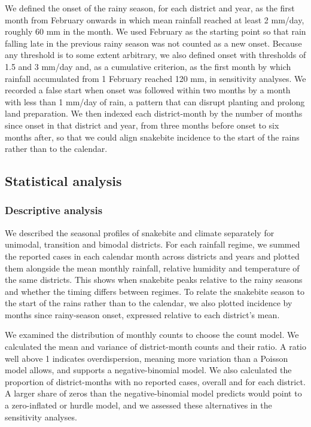 \documentclass[11pt,a4paper]{article}
\begin{document}
We defined the onset of the rainy season, for each district and year, as the first month from February onwards in which mean rainfall reached at least 2 mm/day, roughly 60 mm in the month. We used February as the starting point so that rain falling late in the previous rainy season was not counted as a new onset. Because any threshold is to some extent arbitrary, we also defined onset with thresholds of 1.5 and 3 mm/day and, as a cumulative criterion, as the first month by which rainfall accumulated from 1 February reached 120 mm, in sensitivity analyses. We recorded a false start when onset was followed within two months by a month with less than 1 mm/day of rain, a pattern that can disrupt planting and prolong land preparation. We then indexed each district-month by the number of months since onset in that district and year, from three months before onset to six months after, so that we could align snakebite incidence to the start of the rains rather than to the calendar.

\subsection{Statistical analysis}

\subsubsection{Descriptive analysis}

We described the seasonal profiles of snakebite and climate separately for unimodal, transition and bimodal districts. For each rainfall regime, we summed the reported cases in each calendar month across districts and years and plotted them alongside the mean monthly rainfall, relative humidity and temperature of the same districts. This shows when snakebite peaks relative to the rainy seasons and whether the timing differs between regimes. To relate the snakebite season to the start of the rains rather than to the calendar, we also plotted incidence by months since rainy-season onset, expressed relative to each district's mean.

We examined the distribution of monthly counts to choose the count model. We calculated the mean and variance of district-month counts and their ratio. A ratio well above 1 indicates overdispersion, meaning more variation than a Poisson model allows, and supports a negative-binomial model. We also calculated the proportion of district-months with no reported cases, overall and for each district. A larger share of zeros than the negative-binomial model predicts would point to a zero-inflated or hurdle model, and we assessed these alternatives in the sensitivity analyses.
\end{document}
